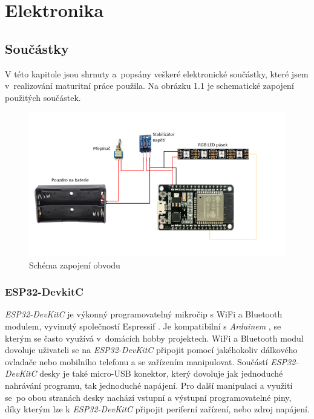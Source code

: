 \chapter{Elektronika}

\section{Součástky}
V této kapitole jsou shrnuty a~popsány veškeré elektronické součástky, které jsem v~realizování maturitní práce použila.
Na obrázku 1.1 je schematické zapojení použitých součástek.

\begin{figure}[htbp]
	\centering
	\includegraphics[width=1\textwidth]{img/01uvod/RGBSchema.png}
	\caption{Schéma zapojení obvodu}
\end{figure}

\subsection{ESP32-DevkitC}
\textit{ESP32-DevKitC} \cite{devkitc-datasheet} je výkonný programovatelný mikročip s WiFi a Bluetooth modulem, vyvinutý společností Espressif \cite{espressif}. Je kompatibilní s \textit{Arduinem} \cite{arduino}, se kterým se často využívá v~domácích hobby projektech. WiFi a Bluetooth modul dovoluje uživateli se na \textit{ESP32-DevKitC} připojit pomocí jakéhokoliv dálkového ovladače nebo mobilního telefonu a se zařízením manipulovat.
Součástí \textit{ESP32-DevKitC} desky je také micro-USB konektor, který dovoluje jak jednoduché nahrávání programu, tak jednoduché napájení. Pro další manipulaci a využití se~po obou stranách desky nachází vstupní a výstupní programovatelné piny, díky kterým lze k \textit{ESP32-DevKitC} připojit periferní zařízení, nebo zdroj napájení.


